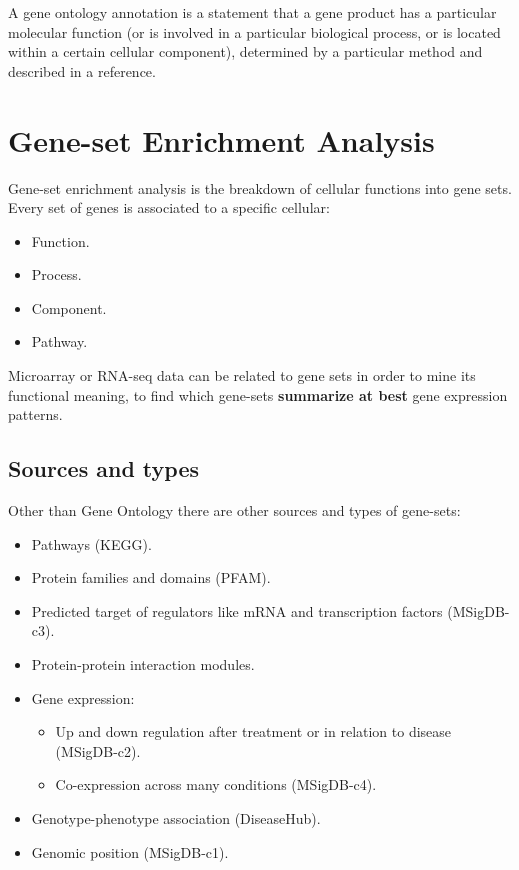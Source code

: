 		A gene ontology annotation is a statement that a gene product has a particular molecular function (or is involved in a particular biological process, or is located within a certain cellular component), determined by a particular method and described in a reference.

\section{Gene-set Enrichment Analysis}\label{sec:genesets}
Gene-set enrichment analysis is the breakdown of cellular functions into gene sets.
Every set of genes is associated to a specific cellular:

\begin{multicols}{4}
	\begin{itemize}
		\item Function.
		\item Process.
		\item Component.
		\item Pathway.
	\end{itemize}
\end{multicols}

Microarray or RNA-seq data can be related to gene sets in order to mine its functional meaning, to find which gene-sets \textbf{summarize at best} gene expression patterns.

	\subsection{Sources and types}
	Other than Gene Ontology there are other sources and types of gene-sets:

	\begin{multicols}{2}
		\begin{itemize}
			\item Pathways (KEGG).
			\item Protein families and domains (PFAM).
			\item Predicted target of regulators like mRNA and transcription factors (MSigDB-c3).
			\item Protein-protein interaction modules.
			\item Gene expression:

				\begin{itemize}
					\item Up and down regulation after treatment or in relation to disease (MSigDB-c2).
					\item Co-expression across many conditions (MSigDB-c4).
				\end{itemize}

			\item Genotype-phenotype association (DiseaseHub).
			\item Genomic position (MSigDB-c1).
		\end{itemize}
	\end{multicols}

